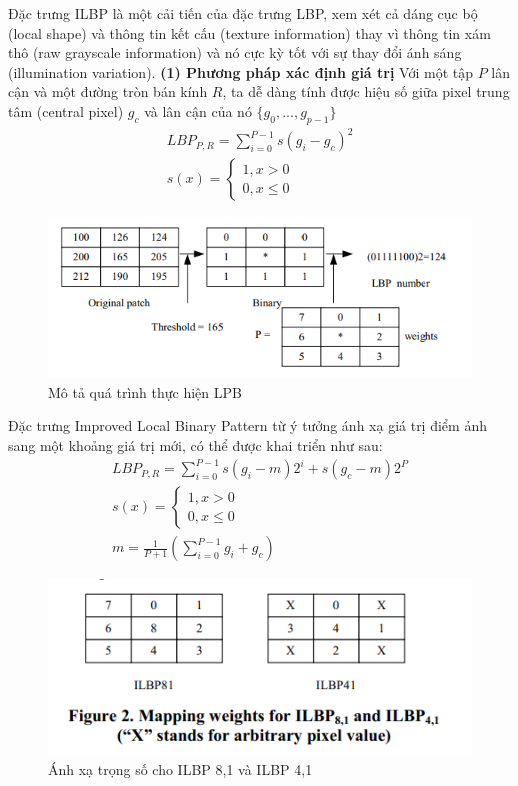 \documentclass{article}
\begin{document}
	Đặc trưng ILBP là một cải tiến của đặc trưng LBP, xem xét cả dáng cục bộ (local shape) và thông tin kết cấu (texture information) thay vì thông tin xám thô (raw grayscale information) và nó cực kỳ tốt với sự thay đổi ánh sáng (illumination variation).\newline
	\textbf{(1) Phương pháp xác định giá trị}\newline
	Với một tập $P$ lân cận và một đường tròn bán kính $R$, ta dễ dàng tính được hiệu số giữa pixel trung tâm (central pixel) $g_c$ và lân cận của nó $\{g_0, ..., g_{p-1}\}$
	\begin{gather*}
		LBP_{P,R} = \sum_{i=0}^{P-1}s(g_i - g_c)^2\\
		s(x) = \begin{cases}
			1, x > 0\\
			0, x \leq 0
		\end{cases}
	\end{gather*}
	\begin{figure}[H]
		\centering
		\includegraphics[width=0.75\linewidth]{images/cau_d.png}
		\caption{Mô tả quá trình thực hiện LPB}
		\label{fig:writing-thesis}
	\end{figure}
	Đặc trưng Improved Local Binary Pattern từ ý tưởng ánh xạ giá trị điểm ảnh sang một khoảng giá trị mới, có thể được khai triển như sau:
	\begin{gather*}
		LBP_{P,R} = \sum_{i=0}^{P-1}s(g_i-m)2^i+s(g_c - m)2^P\\
		s(x) = \begin{cases}
			1, x > 0\\
			0, x \leq 0
		\end{cases}\\
		m = \frac{1}{P+1}\left(\sum_{i=0}^{P-1}g_i + g_c\right)
	\end{gather*}
	\begin{figure}[H]
		\centering
		\includegraphics[width=0.75\linewidth]{images/cau_d_1.png}
		\caption{Ánh xạ trọng số cho ILBP 8,1 và ILBP 4,1}
		\label{fig:writing-thesis}
	\end{figure}
	
\end{document}
